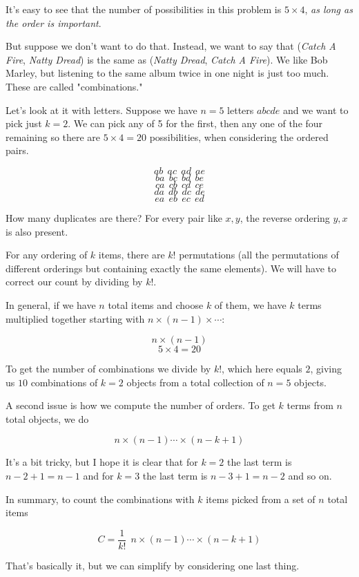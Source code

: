 \documentclass[11pt, oneside]{article}
\begin{document}
It's easy to see that the number of possibilities in this problem is $5 \times 4$, \emph{as long as the order is important}.

But suppose we don't want to do that.  Instead, we want to say that (\emph{Catch A Fire}, \emph{Natty Dread}) is the same as (\emph{Natty Dread}, \emph{Catch A Fire}).  We like Bob Marley, but listening to the same album twice in one night is just too much.  These are called "combinations."

Let's look at it with letters.  Suppose we have $n=5$ letters $abcde$ and we want to pick just $k=2$.  We can pick any of 5 for the first, then any one of the four remaining so there are $5 \times 4 = 20$ possibilities, when considering the ordered pairs.

\[ ab \ \ ac \ \ ad \ \ ae \]
\[ ba \ \ bc \ \ bd \ \ be \]
\[ ca \ \ cb \ \ cd \ \ ce \]
\[ da \ \ db \ \ dc \ \ de \]
\[ ea \ \ eb \ \ ec \ \ ed \]

How many duplicates are there?  For every pair like $x,y$, the reverse ordering $y,x$ is also present.

For any ordering of $k$ items, there are $k!$ permutations (all the permutations of different orderings but containing exactly the same elements).  We will have to correct our count by dividing by $k!$.  

In general, if we have $n$ total items and choose $k$ of them, we have $k$ terms multiplied together starting with $n \times (n-1) \times  \cdots$:

\[ n \times (n-1) \]
\[ 5 \times 4 =  20 \]

To get the number of combinations we divide by $k!$, which here equals $2$, giving us $10$ combinations of $k=2$ objects from a total collection of $n=5$ objects.

A second issue is how we compute the number of orders.  To get $k$ terms from $n$ total objects, we do

\[ n \times (n-1) \cdots \times (n-k+1) \]

It's a bit tricky, but I hope it is clear that for $k=2$ the last term is $n-2+1 = n-1$ and for $k=3$ the last term is $n-3+1 = n-2$ and so on.


In summary, to count the combinations with $k$ items picked from a set of $n$ total items

\[ C = \frac{1}{k!} \ \ n \times (n-1) \cdots \times (n-k+1) \]

That's basically it, but we can simplify by considering one last thing.
\end{document}
